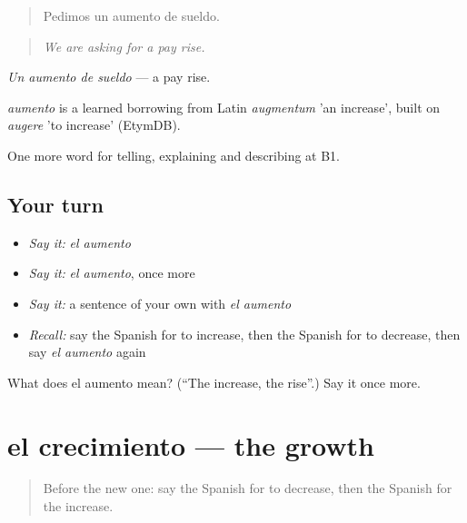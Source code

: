 \begin{quote}
Pedimos un aumento de sueldo.
\end{quote}

\begin{quote}
\emph{We are asking for a pay rise.}
\end{quote}

\emph{Un aumento de sueldo} — a pay rise.

\begin{cousinweb}
\emph{aumento} is a learned borrowing from Latin \emph{augmentum} 'an increase', built on \emph{augere} 'to increase' (EtymDB).
\end{cousinweb}

\begin{grammarlens}[title={What you've built}]
One more word for telling, explaining and describing at B1.
\end{grammarlens}

\subsection*{Your turn}
\begin{itemize}
\raggedright
  \item \emph{Say it:} \emph{el aumento}
  \item \emph{Say it:} \emph{el aumento}, once more
  \item \emph{Say it:} a sentence of your own with \emph{el aumento}
  \item \emph{Recall:} say the Spanish for to increase, then the Spanish for to decrease, then say \emph{el aumento} again
\end{itemize}

\begin{tcolorbox}[breakable,colback=teal!4,colframe=teal!35!black,title={Before you move on}]
What does el aumento mean? (\textquotedblleft{}The increase, the rise\textquotedblright{}.) Say it once more.
\end{tcolorbox}
\section[el crecimiento]{el crecimiento — the growth}

\label{lesson:ES-C608-crecimiento}



\begin{quote}
Before the new one: say the Spanish for to decrease, then the Spanish for the increase.
\end{quote}

